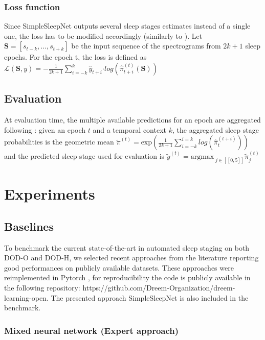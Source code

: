 \documentclass[journal]{IEEEtran}
\begin{document}
\subsubsection{Loss function}
Since SimpleSleepNet outputs several sleep stages estimates instead of a single one, the loss has to be modified accordingly (similarly to \cite{Phan2019}). Let $\mathbf{S}=[s_{t-k},\ldots, s_{t+k}]$ be the input sequence of the spectrograms from $2k+1$ sleep epochs. For the epoch t, the loss is defined as $\mathcal{L}(\mathbf{S},y) = -\frac{1}{2k + 1} \sum_{i=-k}^{k} \hat{y}_{t+i}  \boldsymbol{\cdot} log(\hat{\pi}^{(t)}_{t+i}(\mathbf{S}))$

\subsection{Evaluation}  \label{section_evaluation}
At evaluation time, the multiple available predictions for an epoch are aggregated following \cite{Phan2019}: given an epoch $t$ and a temporal context $k$, the aggregated sleep stage probabilities is the geometric mean 
$\tilde{\pi}^{(t)} = \text{exp}\left( \frac{1}{2k + 1} \sum_{i = -k}^{i =k} log(\hat{\pi}^{(t+i)}_{t}) \right)$
and the predicted sleep stage used for evaluation is $\tilde{y}^{(t)} = \text{argmax}_{\; j \in [\![0,5]\!]} \tilde{\pi}^{(t)}_j $
 
\section{Experiments}

\subsection{Baselines}
\label{sec:baseline}

To benchmark the current state-of-the-art in automated sleep staging on both DOD-O and DOD-H, we selected recent approaches from the literature reporting good performances on publicly available datasets. These approaches were reimplemented in Pytorch \cite{paszke2017automatic}, for reproducibility the code is publicly available in the following repository: https://github.com/Dreem-Organization/dreem-learning-open. The presented approach SimpleSleepNet is also included in the benchmark.

\subsubsection{Mixed neural network (Expert approach) \cite{Dong2018}}
\end{document}
